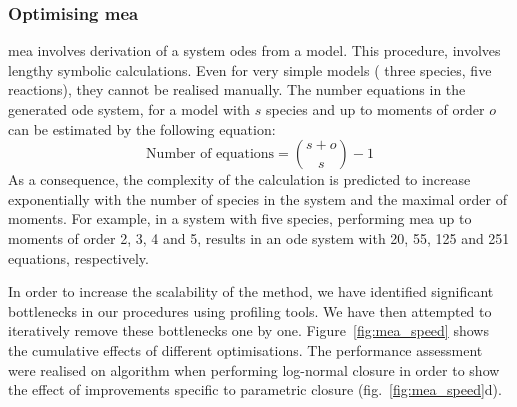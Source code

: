 \subsubsection{Optimising \acrlong{mea}}
\label{sec:optimising_mea}

\gls{mea} involves derivation of a system \gls{ode}s from a model.
This procedure\cite{ale_general_2013}, involves lengthy symbolic calculations.
Even for very simple models (\eg{} three species, five reactions), they cannot be realised manually.
The number equations in the generated \gls{ode} system, for a model with $s$ species and up to moments of order $o$ can be estimated by the following equation: 
\begin{equation}
    \text{Number of equations} = {{s + o} \choose {s}} - 1
    \label{eq:number_of_equations}
\end{equation}
As a consequence, the complexity of the calculation is predicted to increase exponentially with the number of species in the system and the maximal order of moments. 
For example, in a system with five species,  performing \gls{mea} up to moments of order 2, 3, 4 and 5, results in an \gls{ode} system with  20, 55, 125 and 251 equations, respectively. 


In order to increase the scalability of the method, we have identified significant bottlenecks in our procedures using \py{} profiling tools.
We have then attempted to iteratively remove these bottlenecks one by one. Figure~\ref{fig:mea_speed} shows the cumulative effects of different optimisations.
The performance assessment were realised on algorithm when performing log-normal closure in order to show the effect of improvements specific to parametric closure (fig.~\ref{fig:mea_speed}d). 

